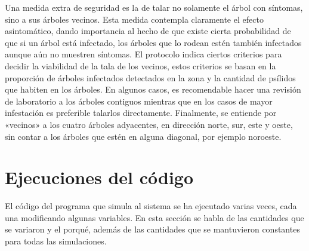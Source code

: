 Una medida extra de seguridad es la de talar no solamente el árbol con síntomas, sino a sus árboles vecinos. Esta medida contempla claramente el efecto asintomático, dando importancia al hecho de que existe cierta probabilidad de que si un árbol está infectado, los árboles que lo rodean estén también infectados aunque aún no muestren síntomas. El protocolo indica ciertos criterios para decidir la viabilidad de la tala de los vecinos, estos criterios se basan en la proporción de árboles infectados detectados en la zona y la cantidad de psílidos que habiten en los árboles. En algunos casos, es recomendable hacer una revisión de laboratorio a los árboles contiguos mientras que en los casos de mayor infestación es preferible talarlos directamente. Finalmente, se entiende por «vecinos» a los cuatro árboles adyacentes, en dirección norte, sur, este y oeste, sin contar a los árboles que estén en alguna diagonal, por ejemplo noroeste.


\section{Ejecuciones del código}
El código del programa que simula al sistema se ha ejecutado varias veces, cada una modificando algunas variables. En esta sección se habla de las cantidades que se variaron y el porqué, además de las cantidades que se mantuvieron constantes para todas las simulaciones.

